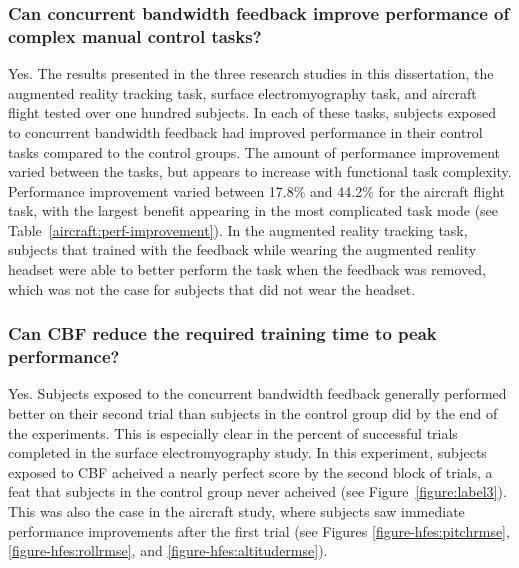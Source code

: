 \subsubsection{Can concurrent bandwidth feedback improve performance of complex manual control tasks?}
Yes.
The results presented in the three research studies in this dissertation, the augmented reality tracking task, surface electromyography task, and aircraft flight tested over one hundred subjects.
In each of these tasks, subjects exposed to concurrent bandwidth feedback had improved performance in their control tasks compared to the control groups.
The amount of performance improvement varied between the tasks, but appears to increase with functional task complexity.
Performance improvement varied between 17.8\% and 44.2\% for the aircraft flight task, with the largest benefit appearing in the most complicated task mode (see Table~\ref{aircraft:perf-improvement}).
In the augmented reality tracking task, subjects that trained with the feedback while wearing the augmented reality headset were able to better perform the task when the feedback was removed, which was not the case for subjects that did not wear the headset.

\subsubsection{Can CBF reduce the required training time to peak performance?}
Yes.
Subjects exposed to the concurrent bandwidth feedback generally performed better on their second trial than subjects in the control group did by the end of the experiments.
This is especially clear in the percent of successful trials completed in the surface electromyography study.
In this experiment, subjects exposed to CBF acheived a nearly perfect score by the second block of trials, a feat that subjects in the control group never acheived (see Figure~\ref{figure:label3}).
This was also the case in the aircraft study, where subjects saw immediate performance improvements after the first trial (see Figures \ref{figure-hfes:pitchrmse}, \ref{figure-hfes:rollrmse}, and \ref{figure-hfes:altitudermse}).

